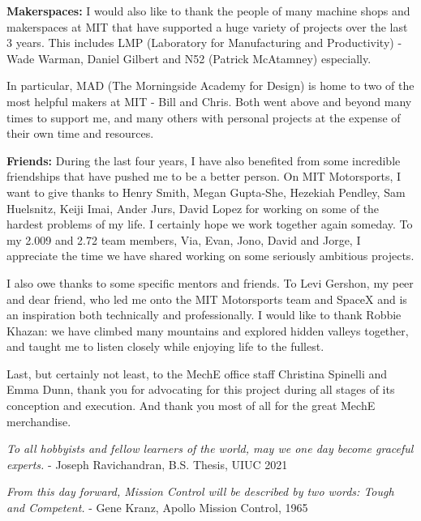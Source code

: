 \textbf{Makerspaces: }
I would also like to thank the people of many machine shops and makerspaces at MIT that have supported a huge variety of projects over the last 3 years. This includes LMP (Laboratory for Manufacturing and Productivity) - Wade Warman, Daniel Gilbert and N52 (Patrick McAtamney) especially.

In particular, MAD (The Morningside Academy for Design) is home to two of the most helpful makers at MIT - Bill and Chris. Both went above and beyond many times to support me, and many others with personal projects at the expense of their own time and resources.

\textbf{Friends: }
During the last four years, I have also benefited from some incredible friendships that have pushed me to be a better person. On MIT Motorsports, I want to give thanks to Henry Smith, Megan Gupta-She, Hezekiah Pendley, Sam Huelsnitz, Keiji Imai, Ander Jurs, David Lopez for working on some of the hardest problems of my life. I certainly hope we work together again someday. To my 2.009 and 2.72 team members, Via, Evan, Jono, David and Jorge, I appreciate the time we have shared working on some seriously ambitious projects.

I also owe thanks to some specific mentors and friends. To Levi Gershon, my peer and dear friend, who led me onto the MIT Motorsports team and SpaceX and is an inspiration both technically and professionally. 
I would like to thank Robbie Khazan: we have climbed many mountains and explored hidden valleys together, and taught me to listen closely while enjoying life to the fullest.
	
Last, but certainly not least, to the MechE office staff Christina Spinelli and Emma Dunn, thank you for advocating for this project during all stages of its conception and execution. And thank you most of all for the great MechE merchandise.

\break

\textit{To all hobbyists and fellow learners of the world, may we one day become graceful experts.}
- Joseph Ravichandran, B.S. Thesis, UIUC 2021

\textit{From this day forward, Mission Control will be described by two words: Tough and Competent.} - Gene Kranz, Apollo Mission Control, 1965